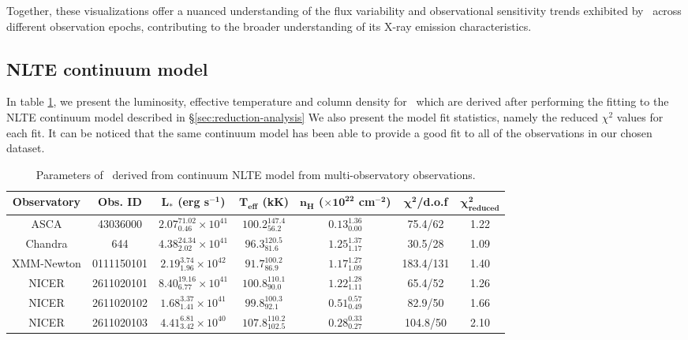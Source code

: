     Together, these visualizations offer a nuanced understanding of the flux variability and observational sensitivity trends exhibited by \source\ across different observation epochs, contributing to the broader understanding of its X-ray emission characteristics.
    
    \subsection{NLTE continuum model}
    In table \ref{tab:res-fitting}, we present the luminosity, effective temperature and column density for \source\ which are derived after performing the fitting to the NLTE continuum model described in \S \ref{sec:reduction-analysis} We also present the model fit statistics, namely the reduced $\chi^2$ values for each fit. It can be noticed that the same continuum model has been able to provide a good fit to all of the observations in our chosen dataset.
    \begin{table}[!htb]
    	\centering
    	\caption{Parameters of \source\ derived from continuum NLTE model from multi-observatory observations.}
    	\label{tab:res-fitting}
    	\begin{tabular}{ccccccc}
			\hline
			{\textbf{Observatory}} & {\textbf{Obs. ID}} & {$\boldsymbol{L_*}$ \textbf{(erg s$\boldsymbol{^{-1}}$)}} & {\textbf{$\boldsymbol{T_\text{eff}}$ (kK)}} & {\textbf{$\boldsymbol{n_H}$ ($\boldsymbol{\times 10^{22}}$ cm$\boldsymbol{^{-2}}$)}} & {$\boldsymbol{\chi^2}$/\textbf{d.o.f}} & {$\boldsymbol{\chi^2_\text{reduced}}$} \\
			\hline
			{ASCA} & {43036000} & {$2.07_{0.46}^{71.02}\times 10^{41}$} & {$100.2_{56.2}^{147.4}$} & {$0.13_{0.00}^{1.36}$} & {75.4/62} & {1.22} \\ %
			{Chandra} & {644} & {$4.38_{2.02}^{24.34}\times 10^{41}$} & {$96.3_{81.6}^{120.5}$} & {$1.25_{1.17}^{1.37}$} & {30.5/28} & {1.09} \\ %
			{XMM-Newton} & {0111150101} & {$2.19_{1.96}^{3.74}\times 10^{42}$} & {$91.7_{86.9}^{100.2}$} & {$1.17_{1.09}^{1.27}$} & {183.4/131} & {1.40} \\ %
			{NICER} & {2611020101} & {$8.40_{6.77}^{19.16}\times 10^{41}$} & {$100.8_{90.0}^{110.1}$} & {$1.22_{1.11}^{1.28}$} & {65.4/52} & {1.26} \\ %
			{NICER} & {2611020102} & {$1.68_{1.41}^{3.37}\times 10^{41}$} & {$99.8_{92.1}^{100.3}$} & {$0.51_{0.49}^{0.57}$} & {82.9/50} & {1.66} \\
			{NICER} & {2611020103} & {$4.41_{3.42}^{6.81}\times 10^{40}$} & {$107.8_{102.5}^{110.2}$} & {$0.28_{0.27}^{0.33}$} & {104.8/50} & {2.10} \\
			\hline
		\end{tabular}
	\end{table}
    
